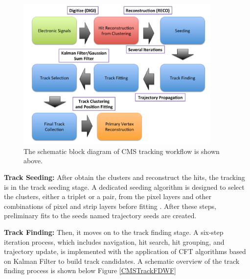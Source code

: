 \begin{figure}[hbtp]
\begin{center}
\includegraphics[width=0.90\textwidth]{Figures/Chapter4/TrackWF.pdf}
\caption{The schematic block diagram of CMS tracking workflow is shown above.}
\label{TrackWorkFlow}
\end{center}
\end{figure} 



\textbf{Track Seeding:} After obtain the clusters and reconstruct the hits, the tracking is in the track seeding stage. A dedicated seeding algorithm is designed to select the clusters, either a triplet or a pair, from the pixel layers and other combinations of pixel and strip layers before fitting \cite{CMSTrackComp}. After these steps, preliminary fits to the seeds named trajectory seeds are created.


\textbf{Track Finding:} Then, it moves on to the track finding stage. A six-step iteration process, which includes navigation, hit search, hit grouping, and trajectory update, is implemented with the application of CFT algorithms based on Kalman Filter to build track candidates. A schematic overview of the track finding process is shown below Figure \ref{CMSTrackFDWF}

